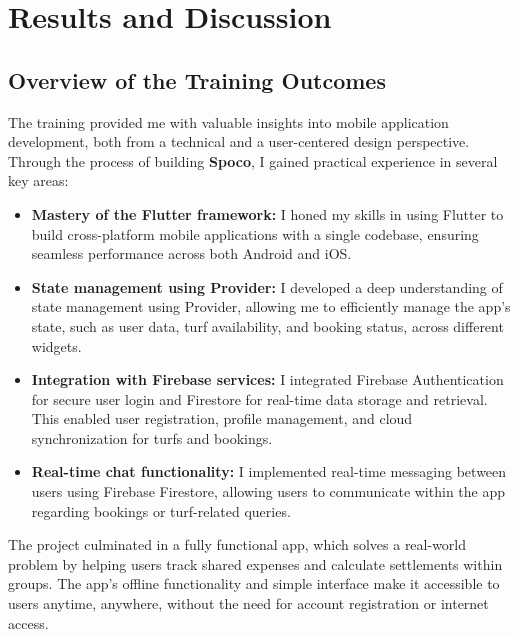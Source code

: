 \documentclass[12pt,a4paper]{report}
\begin{document}
\chapter{Results and Discussion}

\section{Overview of the Training Outcomes}
The training provided me with valuable insights into mobile application development, both from a technical and a user-centered design perspective. Through the process of building \textbf{Spoco}, I gained practical experience in several key areas:
\begin{itemize}
    \item \textbf{Mastery of the Flutter framework:} I honed my skills in using Flutter to build cross-platform mobile applications with a single codebase, ensuring seamless performance across both Android and iOS.
    \item \textbf{State management using Provider:}  I developed a deep understanding of state management using Provider, allowing me to efficiently manage the app’s state, such as user data, turf availability, and booking status, across different widgets.
    \item\textbf{Integration with Firebase services:}  I integrated Firebase Authentication for secure user login and Firestore for real-time data storage and retrieval. This enabled user registration, profile management, and cloud synchronization for turfs and bookings.
    \item \textbf{Real-time chat functionality:} I implemented real-time messaging between users using Firebase Firestore, allowing users to communicate within the app regarding bookings or turf-related queries.
\end{itemize}

The project culminated in a fully functional app, which solves a real-world problem by helping users track shared expenses and calculate settlements within groups. The app's offline functionality and simple interface make it accessible to users anytime, anywhere, without the need for account registration or internet access.
\end{document}

